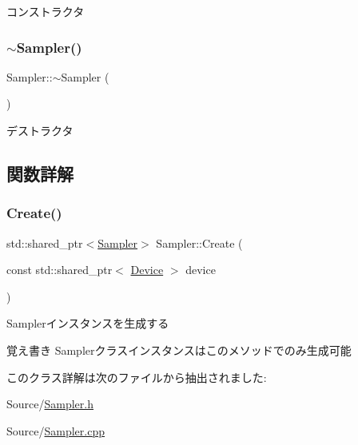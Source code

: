 コンストラクタ 

\mbox{\label{class_sampler_afbbbd238b78dd3024686c852b69fa64e}} 
\subsubsection{\texorpdfstring{$\sim$\+Sampler()}{~Sampler()}}
{\footnotesize\ttfamily Sampler\+::$\sim$\+Sampler (\begin{DoxyParamCaption}{ }\end{DoxyParamCaption})}



デストラクタ 



\subsection{関数詳解}
\mbox{\label{class_sampler_a24b78ac0627c5feb7e12c860e4bacc87}} 
\subsubsection{\texorpdfstring{Create()}{Create()}}
{\footnotesize\ttfamily std\+::shared\+\_\+ptr$<$\mbox{\hyperlink{class_sampler}{Sampler}}$>$ Sampler\+::\+Create (\begin{DoxyParamCaption}\item[{const std\+::shared\+\_\+ptr$<$ \mbox{\hyperlink{class_device}{Device}} $>$}]{device }\end{DoxyParamCaption})}



Samplerインスタンスを生成する 

\begin{DoxyNote}{覚え書き}
Samplerクラスインスタンスはこのメソッドでのみ生成可能 
\end{DoxyNote}


このクラス詳解は次のファイルから抽出されました\+:\begin{DoxyCompactItemize}
\item 
Source/\mbox{\hyperlink{_sampler_8h}{Sampler.\+h}}\item 
Source/\mbox{\hyperlink{_sampler_8cpp}{Sampler.\+cpp}}\end{DoxyCompactItemize}
